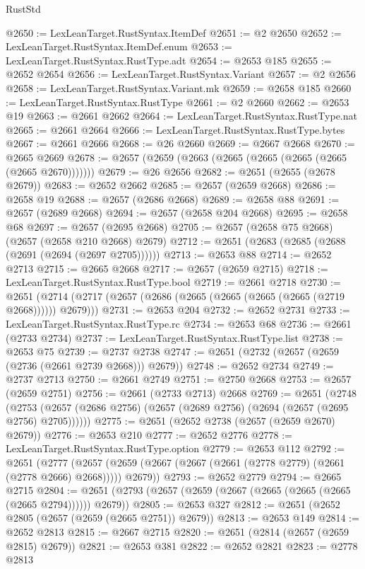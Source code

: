 \begin{lexlean}{RustStd}
\begin{coremodule}
@2650 := LexLeanTarget.RustSyntax.ItemDef
@2651 := @2 @2650
@2652 := LexLeanTarget.RustSyntax.ItemDef.enum
@2653 := LexLeanTarget.RustSyntax.RustType.adt
@2654 := @2653 @185
@2655 := @2652 @2654
@2656 := LexLeanTarget.RustSyntax.Variant
@2657 := @2 @2656
@2658 := LexLeanTarget.RustSyntax.Variant.mk
@2659 := @2658 @185
@2660 := LexLeanTarget.RustSyntax.RustType
@2661 := @2 @2660
@2662 := @2653 @19
@2663 := @2661 @2662
@2664 := LexLeanTarget.RustSyntax.RustType.nat
@2665 := @2661 @2664
@2666 := LexLeanTarget.RustSyntax.RustType.bytes
@2667 := @2661 @2666
@2668 := @26 @2660
@2669 := @2667 @2668
@2670 := @2665 @2669
@2678 := @2657 (@2659 (@2663 (@2665 (@2665 (@2665 (@2665 (@2665 @2670)))))))
@2679 := @26 @2656
@2682 := @2651 (@2655 (@2678 @2679))
@2683 := @2652 @2662
@2685 := @2657 (@2659 @2668)
@2686 := @2658 @19
@2688 := @2657 (@2686 @2668)
@2689 := @2658 @88
@2691 := @2657 (@2689 @2668)
@2694 := @2657 (@2658 @204 @2668)
@2695 := @2658 @68
@2697 := @2657 (@2695 @2668)
@2705 := @2657 (@2658 @75 @2668) (@2657 (@2658 @210 @2668) @2679)
@2712 := @2651 (@2683 (@2685 (@2688 (@2691 (@2694 (@2697 @2705))))))
@2713 := @2653 @88
@2714 := @2652 @2713
@2715 := @2665 @2668
@2717 := @2657 (@2659 @2715)
@2718 := LexLeanTarget.RustSyntax.RustType.bool
@2719 := @2661 @2718
@2730 := @2651 (@2714 (@2717 (@2657 (@2686 (@2665 (@2665 (@2665 (@2665 (@2719 @2668)))))) @2679)))
@2731 := @2653 @204
@2732 := @2652 @2731
@2733 := LexLeanTarget.RustSyntax.RustType.rc
@2734 := @2653 @68
@2736 := @2661 (@2733 @2734)
@2737 := LexLeanTarget.RustSyntax.RustType.list
@2738 := @2653 @75
@2739 := @2737 @2738
@2747 := @2651 (@2732 (@2657 (@2659 (@2736 (@2661 @2739 @2668))) @2679))
@2748 := @2652 @2734
@2749 := @2737 @2713
@2750 := @2661 @2749
@2751 := @2750 @2668
@2753 := @2657 (@2659 @2751)
@2756 := @2661 (@2733 @2713) @2668
@2769 := @2651
    (@2748 (@2753 (@2657 (@2686 @2756) (@2657 (@2689 @2756) (@2694 (@2657 (@2695 @2756) @2705))))))
@2775 := @2651 (@2652 @2738 (@2657 (@2659 @2670) @2679))
@2776 := @2653 @210
@2777 := @2652 @2776
@2778 := LexLeanTarget.RustSyntax.RustType.option
@2779 := @2653 @112
@2792 := @2651
    (@2777 (@2657 (@2659 (@2667 (@2667 (@2661 (@2778 @2779) (@2661 (@2778 @2666) @2668))))) @2679))
@2793 := @2652 @2779
@2794 := @2665 @2715
@2804 := @2651 (@2793 (@2657 (@2659 (@2667 (@2665 (@2665 (@2665 (@2665 @2794)))))) @2679))
@2805 := @2653 @327
@2812 := @2651 (@2652 @2805 (@2657 (@2659 (@2665 @2751)) @2679))
@2813 := @2653 @149
@2814 := @2652 @2813
@2815 := @2667 @2715
@2820 := @2651 (@2814 (@2657 (@2659 @2815) @2679))
@2821 := @2653 @381
@2822 := @2652 @2821
@2823 := @2778 @2813

\end{coremodule}
\end{lexlean}
